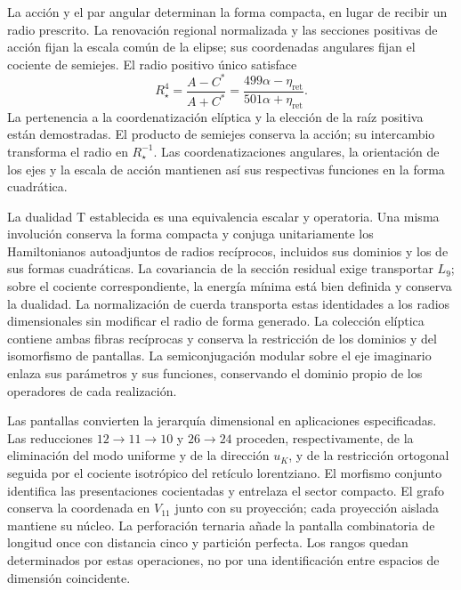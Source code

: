 La acción y el par angular determinan la forma compacta, en lugar de
recibir un radio prescrito. La renovación regional normalizada y las
secciones positivas de acción fijan la escala común de la elipse;
sus coordenadas angulares fijan el cociente de semiejes. El radio
positivo único satisface
\[
 R_\star^4=\frac{A-C^*}{A+C^*}
 =\frac{499\alpha-\eta_{\mathrm{ret}}}{501\alpha+\eta_{\mathrm{ret}}}.
\]
La pertenencia a la coordenatización elíptica y la elección de la raíz positiva
están demostradas. El producto de semiejes conserva la acción;
su intercambio transforma el radio en \(R_\star^{-1}\).
Las coordenatizaciones angulares, la orientación de los ejes y la escala de acción
mantienen así sus respectivas funciones en la forma cuadrática.

La dualidad T establecida es una equivalencia escalar y operatoria.
Una misma involución conserva la forma compacta y conjuga unitariamente
los Hamiltonianos autoadjuntos de radios recíprocos, incluidos sus
dominios y los de sus formas cuadráticas. La covariancia de la sección
residual exige transportar \(L_9\); sobre el cociente correspondiente,
la energía mínima está bien definida y conserva la dualidad.
La normalización de cuerda transporta estas identidades a los radios
dimensionales sin modificar el radio de forma generado. La colección
elíptica contiene ambas fibras recíprocas y conserva la restricción
de los dominios y del isomorfismo de pantallas. La semiconjugación
modular sobre el eje imaginario enlaza sus parámetros y sus funciones,
conservando el dominio propio de los operadores de cada realización.

Las pantallas convierten la jerarquía dimensional en aplicaciones
especificadas. Las reducciones \(12\to11\to10\) y \(26\to24\)
proceden, respectivamente, de la eliminación del modo uniforme y de la
dirección \(u_K\), y de la restricción ortogonal seguida por el cociente
isotrópico del retículo lorentziano. El morfismo conjunto identifica
las presentaciones cocientadas y entrelaza el sector compacto.
El grafo conserva la coordenada en \(V_{11}\) junto con su proyección;
cada proyección aislada mantiene su núcleo. La perforación ternaria
añade la pantalla combinatoria de longitud once con distancia cinco
y partición perfecta. Los rangos quedan determinados por estas
operaciones, no por una identificación entre espacios de dimensión
coincidente.

